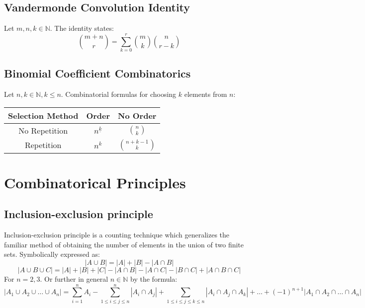 \documentclass{article}
\newenvironment{definition}[1]{%
    \trivlist
    \item[\hskip\labelsep\textbf{Definition. #1.}]
    \ignorespaces
}{%
    \endtrivlist
}
\newenvironment{theorem}[1]{%
    \trivlist
    \item[\hskip\labelsep\textbf{Theorem. #1.}]
    \ignorespaces
}{%
    \endtrivlist
}
\newenvironment{information}[1]{%
    \trivlist
    \item[\hskip\labelsep\textbf{Information. #1.}]
    \ignorespaces
}{%
    \endtrivlist
}
\begin{document}
\subsection{Vandermonde Convolution Identity}

\begin{theorem}{Vandermonde's Convolution Identity}
    Let $m,n, k \in \mathbb{N}$. The identity states:
    \[\binom{m+n}{r}=\sum _{k=0}^{r}\binom{m}{k}\binom{n}{r-k}\]
\end{theorem}

\subsection{Binomial Coefficient Combinatorics}

\begin{information}{Choosing $k$ elements from $n$}
    Let $n, k \in\mathbb{N}, k\leq n$. Combinatorial formulas for choosing \( k \) elements from \( n \):
    \begin{table}[htbp]
        \centering
        \bgroup
        \def\arraystretch{1.5}%
        \begin{tabular}{|c|c|c|}
            \hline
            \textbf{Selection Method} & \textbf{Order} & \textbf{No Order} \\
            \hline
            No Repetition & \( n^{\underline{k}} \) & \( \binom{n}{k} \) \\
            \hline
            Repetition & \( n^{k} \) & \( \binom{n+k-1}{k} \) \\
            \hline
        \end{tabular}
        \egroup
    \end{table}
\end{information}

\section{Combinatorical Principles}

\subsection{Inclusion-exclusion principle}

\begin{definition}{Inclusion-exclusion principle}
    Inclusion-exclusion principle is a counting technique which generalizes the familiar method of obtaining the number of elements in the union of two finite sets. Symbolically expressed as: 
    \[|A\cup B|=|A|+|B|-|A\cap B|\]
    \[|A\cup B\cup C|=|A|+|B|+|C|-|A\cap B|-|A\cap C|-|B\cap C|+|A\cap B\cap C|\]
    For $n={2,3}$. Or further in general $n\in\mathbb{N}$ by the formula:
    \[|A_1\cup A_2\cup \dots \cup A_n| = 
    \sum_{i=1}^{n} A_i
    - \sum_{1\leq i\leq j\leq n}^{n} |A_i \cap A_j |
    + \sum_{1\leq i\leq j\leq k\leq n} |A_i \cap A_j \cap A_k|
    + \dots 
    + (-1)^{n+1} |A_1\cap A_2\cap \dots \cap A_n|\]
\end{definition}
\end{document}
